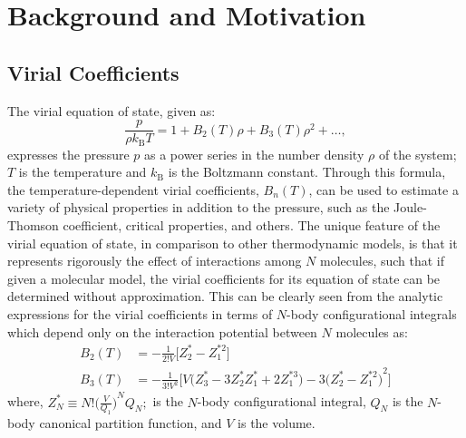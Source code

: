 \chapter{Background and Motivation}
\label{chap:introduction}
    \section{Virial Coefficients}
    \label{sec:chap1VirialCoefficients}
        The virial equation of state, given as:
        \begin{equation}
          \frac{p}{\rho k_\text{B}T} = 1 + B_2(T) \rho + B_3(T) \rho^2 + \ldots,
        \end{equation}
        expresses the pressure $p$ as a power series in the number density $\rho$ of the system; $T$ is the temperature and $k_\text{B}$ is the Boltzmann constant. Through this formula, the temperature-dependent virial coefficients, $B_n(T)$, can be used to estimate a variety of physical properties in addition to the pressure, such as the Joule-Thomson coefficient,  critical properties, and others. The unique feature of the virial equation of state, in comparison to other thermodynamic models, is that it represents rigorously the effect of interactions among $N$ molecules, such that if given a molecular model, the virial coefficients for its equation of state can be determined without approximation. This can be clearly seen from the analytic expressions for the virial coefficients in terms of $N$-body configurational integrals \cite{Tester} which depend only on the interaction potential between $N$ molecules as:
        \begin{equation}\label{eq: bn}
            \begin{aligned}
                B_2(T) &= - \frac{1}{2! {V}}  \Big[ Z_2^* - Z_1^{*2} \Big]\\
                B_3(T) &= - \frac{1}{3! {V}^2}  \Big[ {V}  \big( Z_3^* - 3  Z_2^*  Z_1^* + 2  Z_1^{*3} \big) - 3  {\big( Z_2^* - Z_1^{*2} \big)}^2 \Big]
            \end{aligned}
        \end{equation}
        where, $ Z_N^* \equiv N!  {\Big( \displaystyle\frac{{V}}{Q_1} \Big)}^N  Q_N ;$ is the $N$-body configurational integral, $Q_N$ is the $N$-body canonical partition function, and ${V}$ is the volume.

